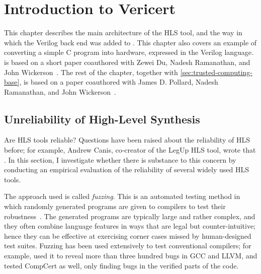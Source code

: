 \chapter{Introduction to Vericert}%
\label{sec:introduction-to-vericert}

\begin{chapsummary}
  This chapter describes the main architecture of the HLS tool, and the way in
  which the Verilog back end was added to \compcert{}.  This chapter also covers
  an example of converting a simple C program into hardware, expressed in the
  Verilog language.   is based on a short paper
  coauthored with Zewei Du, Nadesh Ramanathan, and John
  Wickerson~\cite{herklotz21_esrhlst}.  The rest of the chapter, together with
  \cref{sec:trusted-computing-base}, is based on a paper coauthored with James
  D. Pollard, Nadesh Ramanathan, and John Wickerson~\cite{herklotz21_fvhls}.
\end{chapsummary}

\section{Unreliability of High-Level Synthesis}%
\label{sec:itv:unreliability-hls}

Are \gls{HLS} tools reliable? Questions have been raised about the reliability
of HLS before; for example, Andrew Canis, co-creator of the LegUp HLS tool,
wrote that .  In this section, I
investigate whether there is substance to this concern by conducting an
empirical evaluation of the reliability of several widely used HLS tools.

The approach used is called \emph{fuzzing}.  This is an automated testing method
in which randomly generated programs are given to compilers to test their
robustness~\cite{chen13_tcf, sun16_tucbgl, liang18_f, zhang19_fubsmc,
  yang11_findin_under_bugs_c_compil, lidbury15_many_core_compil_fuzzin}.  The
generated programs are typically large and rather complex, and they often
combine language features in ways that are legal but counter-intuitive; hence
they can be effective at exercising corner cases missed by human-designed test
suites.  Fuzzing has been used extensively to test conventional compilers; for
example, \textcite{yang11_findin_under_bugs_c_compil} used it to reveal more
than three hundred bugs in GCC and LLVM, and tested CompCert as well, only
finding bugs in the verified parts of the code.

